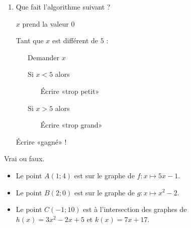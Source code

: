 \begin{MentalActivity}
\begin{mental}
\begin{enumerate}
    \begin{fmpage}{0.9\linewidth}

    Demander \( x\)

    Si \( x < 5\) alors

    ~~~ Écrire «trop petit» 

    Sinon 

    ~~~ Écrire «trop grand» 
\end{fmpage}

\item
    Que fait l'algorithme suivant ?

    \begin{fmpage}{0.9\linewidth}

        \( x\) prend la valeur 0

        Tant que \( x\) est différent de \( 5\) :

  ~ ~     Demander \( x\)

~ ~     Si \( x < 5\) alors

   ~ ~ ~~~ Écrire «trop petit» 

 ~ ~   Si \( x>5\) alors

  ~ ~  ~~~ Écrire «trop grand» 

    Écrire «gagné» !

\end{fmpage}

    \end{enumerate}
\end{mental}

\end{MentalActivity}


\begin{MentalActivity}

    \begin{mental}
        Vrai ou faux.
        \begin{itemize}
            \item Le point \( A(1;4)\) est sur le graphe de \( f\colon x\mapsto 5x-1\).
            \item Le point \( B(2;0)\) est sur le graphe de \( g\colon x\mapsto x^2-2\).
            \item Le point \( C(-1;10)\) est à l'intersection  des graphes de \( h(x)=3x^2-2x+5\) et \( k(x)=7x+17\).
        \end{itemize}
    \end{mental}
\end{MentalActivity}

